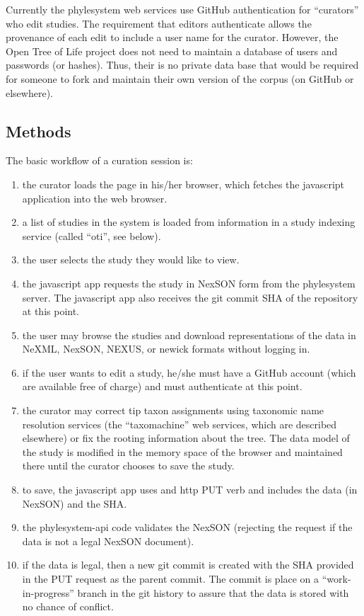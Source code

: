 \documentclass{bioinfo}
\newcommand{\ps}{phylesystem\xspace}
\newcommand{\otol}{Open Tree of Life\xspace}
\begin{document}
Currently the \ps web services use GitHub authentication for ``curators'' who edit studies.
The requirement that editors authenticate allows the provenance of each edit to include 
    a user name for the curator.
However, the \otol project does not need to maintain a database of users and passwords (or hashes).
Thus, their is no private data base that would be required for someone to fork and maintain their
    own version of the corpus (on GitHub or elsewhere).

\begin{methods}
\section{Methods}
The basic workflow of a curation session is:
\begin{enumerate}
    \item the curator loads the page in his/her browser, which fetches the javascript application into the web browser.
    \item a list of studies in the system is loaded from information in a study indexing service (called ``oti'', see below).
    \item the user selects the study they would like to view.
    \item the javascript app requests the study in NexSON form from the \ps server. The javascript app also receives the git commit SHA of the 
        repository at this point.
    \item the user may browse the studies and download representations of the data in NeXML, NexSON, NEXUS, or newick formats without logging in.
    \item if the user wants to edit a study, he/she must have a GitHub account (which are available free of charge) and must authenticate at this point.
    \item the curator may correct tip taxon assignments using taxonomic name resolution services (the ``taxomachine'' web services, which are described
        elsewhere) or fix the rooting information about the tree. The data model of the study is modified in the memory space of the 
        browser and maintained there until the curator chooses to save the study.
    \item to save, the javascript app uses and http PUT verb and includes the data (in NexSON) and the SHA.
    \item the \ps-api code validates the NexSON (rejecting the request if the data is not a legal NexSON document).
    \item if the data is legal, then a new git commit is created with the SHA provided in the PUT request as the parent commit. The commit is place on a ``work-in-progress'' branch in the git history to assure that the data is stored with no chance of conflict.

\end{enumerate}
\end{methods}
\end{document}

